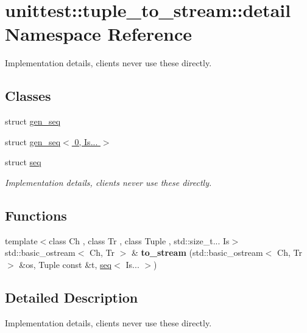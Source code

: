 \hypertarget{namespaceunittest_1_1tuple__to__stream_1_1detail}{}\section{unittest\+:\+:tuple\+\_\+to\+\_\+stream\+:\+:detail Namespace Reference}
\label{namespaceunittest_1_1tuple__to__stream_1_1detail}


Implementation details, clients never use these directly.  


\subsection*{Classes}
\begin{DoxyCompactItemize}
\item 
struct \hyperlink{structunittest_1_1tuple__to__stream_1_1detail_1_1gen__seq}{gen\+\_\+seq}
\item 
struct \hyperlink{structunittest_1_1tuple__to__stream_1_1detail_1_1gen__seq_3_010_00_01_is_8_8_8_01_4}{gen\+\_\+seq$<$ 0, Is... $>$}
\item 
struct \hyperlink{structunittest_1_1tuple__to__stream_1_1detail_1_1seq}{seq}
\begin{DoxyCompactList}\small\item\em Implementation details, clients never use these directly. \end{DoxyCompactList}\end{DoxyCompactItemize}
\subsection*{Functions}
\begin{DoxyCompactItemize}
\item 
{\footnotesize template$<$class Ch , class Tr , class Tuple , std\+::size\+\_\+t... Is$>$ }\\std\+::basic\+\_\+ostream$<$ Ch, Tr $>$ \& {\bfseries to\+\_\+stream} (std\+::basic\+\_\+ostream$<$ Ch, Tr $>$ \&os, Tuple const \&t, \hyperlink{structunittest_1_1tuple__to__stream_1_1detail_1_1seq}{seq}$<$ Is... $>$)\hypertarget{namespaceunittest_1_1tuple__to__stream_1_1detail_a5ae468d1bc1a9bfada84010996bc3bef}{}\label{namespaceunittest_1_1tuple__to__stream_1_1detail_a5ae468d1bc1a9bfada84010996bc3bef}

\end{DoxyCompactItemize}


\subsection{Detailed Description}
Implementation details, clients never use these directly. 